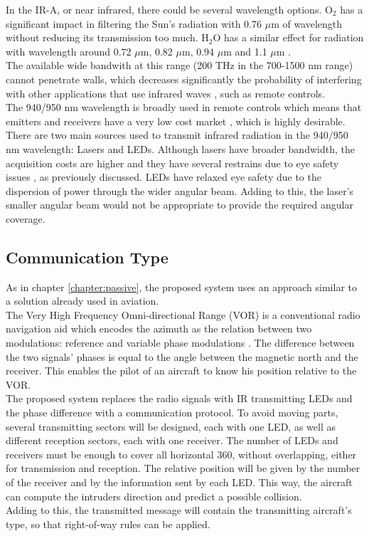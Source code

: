 In the IR-A, or near infrared, there could be several wavelength options. O$_{2}$ has a significant impact in filtering the Sun's radiation with 0.76 $\mu$m of wavelength without reducing its transmission too much. H$_{2}$O has a similar effect for radiation with wavelength around 0.72 $\mu$m, 0.82 $\mu$m, 0.94 $\mu$m and 1.1 $\mu$m \citep{Cox} \citep{Cornelius}.\\
The available wide bandwith at this range (200 THz in the 700-1500 nm range) \citep{Ghassemlooy2006} cannot penetrate walls, which decreases significantly the probability of interfering with other applications that use infrared waves \citep{Pauluzzi1992}, such as remote controls.\\
The 940/950 nm wavelength is broadly used in remote controls which means that emitters and receivers have a very low cost market \citep{Hou2015} \citep{Rao2013}, which is highly desirable.\\

There are two main sources used to transmit infrared radiation in the 940/950 nm wavelength: Lasers and LEDs. Although lasers have broader bandwidth, the acquisition costs are higher \citep{Pauluzzi1992} and they have several restrains due to eye safety issues \citep{Ghassemlooy2006}, as previously discussed. LEDs have relaxed eye safety due to the dispersion of power through the wider angular beam. Adding to this, the laser's smaller angular beam would not be appropriate to provide the required angular coverage.
\subsection{Communication Type}
\label{subsection:communication}
As in chapter \ref{chapter:passive}, the proposed system uses an approach similar to a solution already used in aviation. \\
The Very High Frequency Omni-directional Range (VOR) is a conventional radio navigation aid which encodes the azimuth as the relation between two modulations: reference and variable phase modulations \citep{InternationalCivilAviationOrganization2006}. The difference between the two signals' phases is equal to the angle between the magnetic north and the receiver. This enables the pilot of an aircraft to know his position relative to the VOR.\\
The proposed system replaces the radio signals with IR transmitting LEDs and the phase difference with a communication protocol. To avoid moving parts, several transmitting sectors will be designed, each with one LED, as well as different reception sectors, each with one receiver. The number of LEDs and receivers must be enough to cover all horizontal 360\degree, without overlapping, either for transmission and reception. The relative position will be given by the number of the receiver and by the information sent by each LED. This way, the aircraft can compute the intruders direction and predict a possible collision.\\
Adding to this, the transmitted message will contain the transmitting aircraft's type, so that right-of-way rules can be applied.\\

